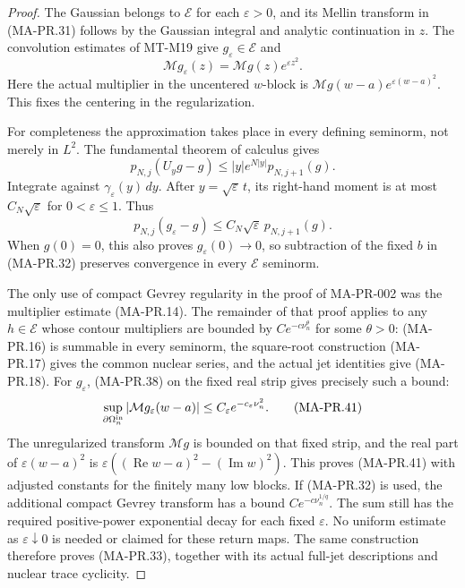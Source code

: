 \begin{proof}
The Gaussian belongs to $\mathcal E$ for each
$\varepsilon>0$, and its Mellin transform in
(MA-PR.31) follows by the Gaussian integral and
analytic continuation in $z$.
The convolution estimates of MT-M19 give
$g_\varepsilon\in\mathcal E$ and
\[
 \mathcal Mg_\varepsilon(z)
       =\mathcal Mg(z)e^{\varepsilon z^2}.
\tag{MA-PR.38}
\]
Here the actual multiplier in the uncentered
$w$-block is
$\mathcal Mg(w-a)e^{\varepsilon(w-a)^2}$.
This fixes the centering in the regularization.

For completeness the approximation takes place in
every defining seminorm, not merely in $L^2$.
The fundamental theorem of calculus gives
\[
 p_{N,j}(U_y g-g)
       \le |y|e^{N|y|}p_{N,j+1}(g).
\tag{MA-PR.39}
\]
Integrate against $\gamma_\varepsilon(y)\,dy$.
After $y=\sqrt{\varepsilon}\,t$, its right-hand
moment is at most $C_N\sqrt{\varepsilon}$ for
$0<\varepsilon\le1$.
Thus
\[
 p_{N,j}(g_\varepsilon-g)
       \le C_N\sqrt{\varepsilon}\,p_{N,j+1}(g).
\tag{MA-PR.40}
\]
When $g(0)=0$, this also proves
$g_\varepsilon(0)\to0$, so subtraction of the
fixed $b$ in (MA-PR.32) preserves convergence
in every $\mathcal E$ seminorm.

The only use of compact Gevrey regularity in the
proof of MA-PR-002 was the multiplier estimate
(MA-PR.14).  The remainder of that proof applies
to any $h\in\mathcal E$ whose contour multipliers
are bounded by $C e^{-c\nu_n^\theta}$ for some
$\theta>0$: (MA-PR.16) is summable in every
seminorm, the square-root construction (MA-PR.17)
gives the common nuclear series, and the actual
jet identities give (MA-PR.18).
For $g_\varepsilon$, (MA-PR.38) on the fixed
real strip gives precisely such a bound:
\[
 \sup_{\partial\Omega_n^{\rm in}}
       |\mathcal Mg_\varepsilon(w-a)|
            \le C_\varepsilon e^{-c_\varepsilon\nu_n^2}.
\tag{MA-PR.41}
\]
The unregularized transform $\mathcal Mg$ is
bounded on that fixed strip, and the real part
of $\varepsilon(w-a)^2$ is
$\varepsilon((\operatorname{Re}w-a)^2-(\operatorname{Im}w)^2)$.
This proves (MA-PR.41) with adjusted constants
for the finitely many low blocks.
If (MA-PR.32) is used, the additional compact
Gevrey transform has a bound
$C e^{-c\nu_n^{1/q}}$.
The sum still has the required positive-power
exponential decay for each fixed $\varepsilon$.
No uniform estimate as $\varepsilon\downarrow0$
is needed or claimed for these return maps.
The same construction therefore proves
(MA-PR.33), together with its actual full-jet
descriptions and nuclear trace cyclicity.


\end{proof}
